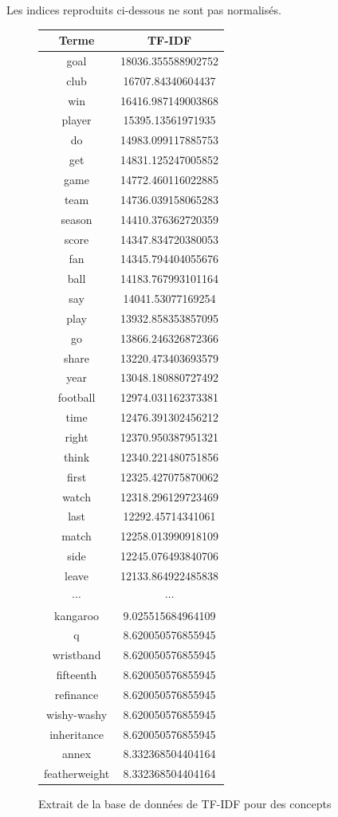 \documentclass[a4paper, 12pt]{article}
\begin{document}
Les indices reproduits ci-dessous ne sont pas normalisés.

\begin{figure}[!h]
\begin{center}
 \begin{tabular}{|c|c|}
 \hline
  \textbf{Terme} & \textbf{TF-IDF} \\
  \hline
  goal & 18036.355588902752 \\
  club & 16707.84340604437 \\
  win & 16416.987149003868 \\
  player & 15395.13561971935 \\
  do & 14983.099117885753 \\
  get & 14831.125247005852 \\
  game & 14772.460116022885 \\
  team & 14736.039158065283 \\
  season & 14410.376362720359 \\
  score & 14347.834720380053 \\
  fan & 14345.794404055676 \\
  ball & 14183.767993101164 \\
  say & 14041.53077169254 \\
  play & 13932.858353857095 \\
  go & 13866.246326872366 \\
  share & 13220.473403693579 \\
  year & 13048.180880727492 \\
  football & 12974.031162373381 \\
  time & 12476.391302456212   \\
  right & 12370.950387951321     \\
  think & 12340.221480751856   \\
  first & 12325.427075870062   \\
  watch & 12318.296129723469   \\
  last & 12292.45714341061   \\
  match & 12258.013990918109   \\
  side & 12245.076493840706   \\
  leave & 12133.864922485838   \\
 $\cdots$ & $\cdots$ \\
    kangaroo  & 9.025515684964109  \\
  q  & 8.620050576855945  \\
  wristband  & 8.620050576855945  \\
  fifteenth  & 8.620050576855945  \\
  refinance  & 8.620050576855945  \\
  wishy-washy  & 8.620050576855945  \\
  inheritance  & 8.620050576855945  \\
  annex  & 8.332368504404164  \\
  featherweight  & 8.332368504404164 \\
  \hline
 \end{tabular}
\label{fig:TFIDFConcepts}
\caption{Extrait de la base de données de TF-IDF pour des concepts}
\end{center}
\end{figure}
\end{document}
